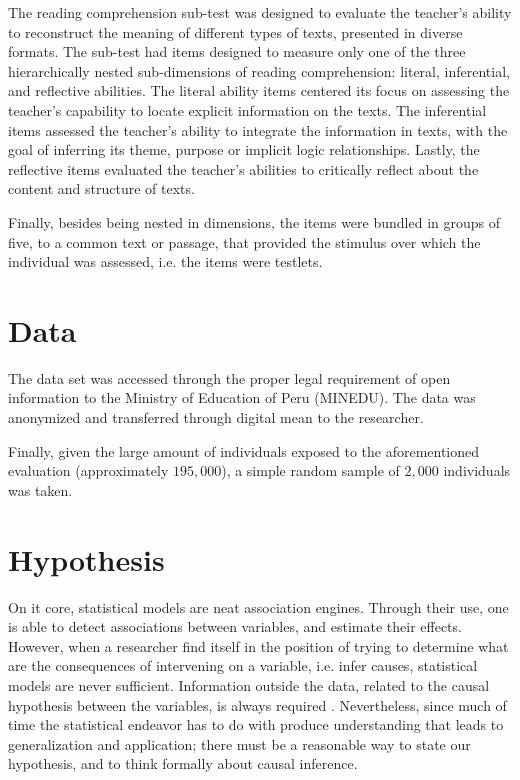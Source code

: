 The reading comprehension sub-test was designed to evaluate the teacher's ability to reconstruct the meaning of different types of texts, presented in diverse formats. The sub-test had items designed to measure only one of the three hierarchically nested sub-dimensions of reading comprehension: literal, inferential, and reflective abilities. The literal ability items centered its focus on assessing the teacher's capability to locate explicit information on the texts. The inferential items assessed the teacher's ability to integrate the information in texts, with the goal of inferring its theme, purpose or implicit logic relationships. Lastly, the reflective items evaluated the teacher's abilities to critically reflect about the content and structure of texts.

Finally, besides being nested in dimensions, the items were bundled in groups of five, to a common text or passage, that provided the stimulus over which the individual was assessed, i.e. the items were testlets. 



\section{Data}

The data set was accessed through the proper legal requirement of open information to the Ministry of Education of Peru (MINEDU). The data was anonymized and transferred through digital mean to the researcher.

Finally, given the large amount of individuals exposed to the aforementioned evaluation (approximately $195,000$), a simple random sample of $2,000$ individuals was taken. 


\section{Hypothesis} \label{sect:hypothesis}

On it core, statistical models are neat association engines. Through their use, one is able to detect associations between variables, and estimate their effects. However, when a researcher find itself in the position of trying to determine what are the consequences of intervening on a variable, i.e. infer causes, statistical models are never sufficient. Information outside the data, related to the causal hypothesis between the variables, is always required \cite{McElreath_2020}. Nevertheless, since much of time the statistical endeavor has to do with produce understanding that leads to generalization and application; there must be a reasonable way to state our hypothesis, and to think formally about causal inference.


